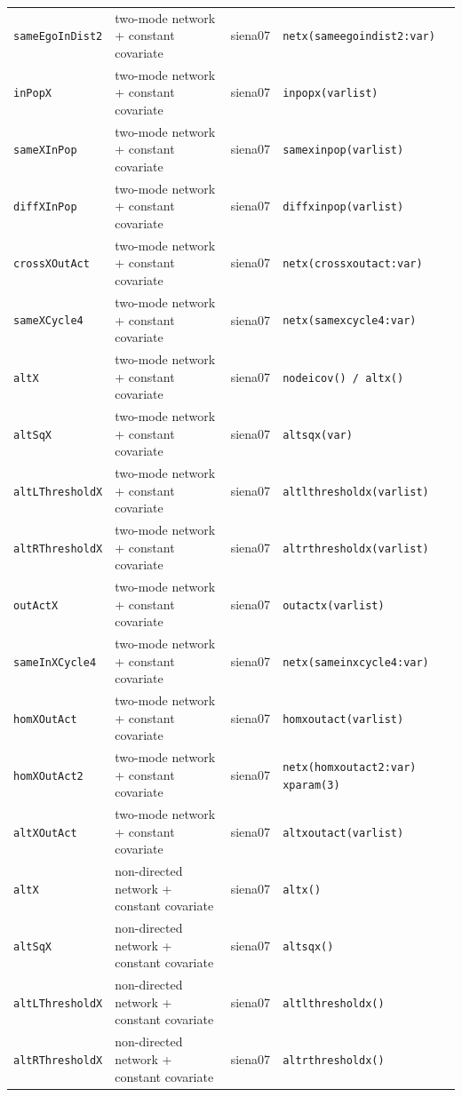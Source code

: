 \begin{longtable}{@{}p{2.6cm}p{3.2cm}p{2.9cm}p{5.4cm}@{}}
\texttt{sameEgoInDist2} & two-mode network + constant covariate & siena07 & \texttt{netx(sameegoindist2:var)}\\
\texttt{inPopX} & two-mode network + constant covariate & siena07 & \texttt{inpopx(varlist)}\\
\texttt{sameXInPop} & two-mode network + constant covariate & siena07 & \texttt{samexinpop(varlist)}\\
\texttt{diffXInPop} & two-mode network + constant covariate & siena07 & \texttt{diffxinpop(varlist)}\\
\texttt{crossXOutAct} & two-mode network + constant covariate & siena07 & \texttt{netx(crossxoutact:var)}\\
\texttt{sameXCycle4} & two-mode network + constant covariate & siena07 & \texttt{netx(samexcycle4:var)}\\
\texttt{altX} & two-mode network + constant covariate & siena07 & \texttt{nodeicov() / altx()}\\
\texttt{altSqX} & two-mode network + constant covariate & siena07 & \texttt{altsqx(var)}\\
\texttt{altLThresholdX} & two-mode network + constant covariate & siena07 & \texttt{altlthresholdx(varlist)}\\
\texttt{altRThresholdX} & two-mode network + constant covariate & siena07 & \texttt{altrthresholdx(varlist)}\\
\texttt{outActX} & two-mode network + constant covariate & siena07 & \texttt{outactx(varlist)}\\
\texttt{sameInXCycle4} & two-mode network + constant covariate & siena07 & \texttt{netx(sameinxcycle4:var)}\\
\texttt{homXOutAct} & two-mode network + constant covariate & siena07 & \texttt{homxoutact(varlist)}\\
\texttt{homXOutAct2} & two-mode network + constant covariate & siena07 & \texttt{netx(homxoutact2:var) xparam(3)}\\
\texttt{altXOutAct} & two-mode network + constant covariate & siena07 & \texttt{altxoutact(varlist)}\\
\texttt{altX} & non-directed network + constant covariate & siena07 & \texttt{altx()}\\
\texttt{altSqX} & non-directed network + constant covariate & siena07 & \texttt{altsqx()}\\
\texttt{altLThresholdX} & non-directed network + constant covariate & siena07 & \texttt{altlthresholdx()}\\
\texttt{altRThresholdX} & non-directed network + constant covariate & siena07 & \texttt{altrthresholdx()}\\

\end{longtable}
